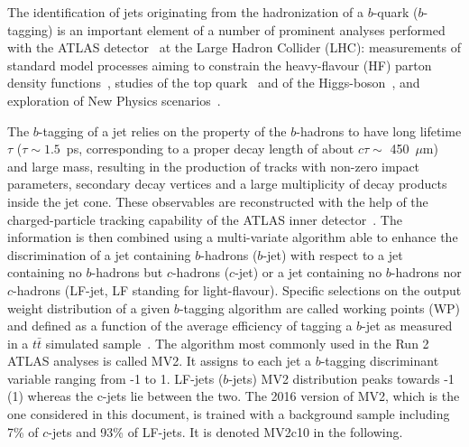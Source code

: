 \newcommand{\AtlasCoordFootnote}{%
ATLAS uses a right-handed coordinate system with its origin at the nominal interaction point (IP)
in the centre of the detector and the $z$-axis along the beam pipe.
The $x$-axis points from the IP to the centre of the LHC ring,
and the $y$-axis points upwards.
Cylindrical coordinates $(r,\phi)$ are used in the transverse plane,
$\phi$ being the azimuthal angle around the $z$-axis.
The pseudorapidity is defined in terms of the polar angle $\theta$ as $\eta = -\ln \tan(\theta/2)$.
Angular distance is measured in units of $\Delta R \equiv \sqrt{(\Delta\eta)^{2} + (\Delta\phi)^{2}}$. The transverse energy is defined as $p_{\mathrm{T}} = E / \cosh(\eta)$.}


The identification of jets originating from the hadronization of a $b$-quark ($b$-tagging) is an important element of a number of prominent analyses performed with the ATLAS detector~\cite{PERF-2007-01} at the Large Hadron Collider (LHC): measurements of standard model processes aiming to constrain the heavy-flavour (HF) parton density functions~\cite{photon_hf}, studies of the top quark~\cite{TOPQ-2013-04} and of the Higgs-boson~\cite{Hbb,ttHtobb}, and exploration of New Physics scenarios~\cite{ttbar_MET, EXOT-2016-12}.

The $b$-tagging of a jet relies on the property of the $b$-hadrons to have long lifetime $\tau$ (${\tau\sim1.5}$~ps, corresponding to a proper decay length of about $c\tau\sim$ 450~$\mu$m) and large mass, resulting in the production of tracks with non-zero impact parameters, secondary decay vertices and a large multiplicity of decay products inside the jet cone. These observables are reconstructed with the help of the charged-particle tracking capability of the ATLAS inner detector~\cite{PERF-2012-04}. The information is then combined using a multi-variate algorithm able to enhance the discrimination of a jet containing $b$-hadrons ($b$-jet) with respect to a jet containing no $b$-hadrons but $c$-hadrons ($c$-jet) or a jet containing no $b$-hadrons nor $c$-hadrons (LF-jet, LF standing for light-flavour). Specific selections on the output weight distribution of a given $b$-tagging algorithm are called working points (WP) and defined as a function of the average efficiency of tagging a $b$-jet as measured in a $t\bar{t}$ simulated sample~\cite{perf_run2,perf_run2_2}. The algorithm most commonly used in the Run 2 ATLAS analyses is called MV2. It assigns to each jet a $b$-tagging discriminant variable ranging from -1 to 1. LF-jets ($b$-jets) MV2 distribution peaks towards -1 (1) whereas the c-jets lie between the two. The 2016 version of MV2, which is the one considered in this document, is trained with a background sample including 7\% of $c$-jets and 93\% of LF-jets. It is denoted MV2c10 in the following.

